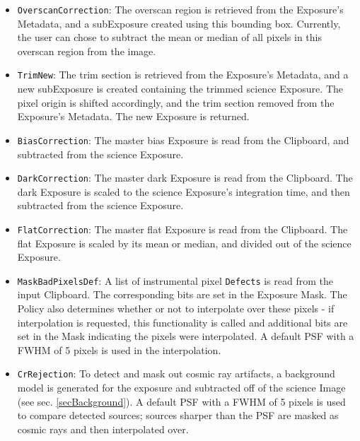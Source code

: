 \begin{itemize}
\item \texttt{OverscanCorrection}: The overscan region is retrieved from the
Exposure's Metadata, and a subExposure created using this bounding
box.  Currently, the user can chose to subtract the mean or median of
all pixels in this overscan region from the image.  

\item \texttt{TrimNew}: The trim section is retrieved from the Exposure's
Metadata, and a new subExposure is created containing the trimmed
science Exposure.  The pixel origin is shifted accordingly, and the
trim section removed from the Exposure's Metadata.  The new Exposure
is returned.

\item \texttt{BiasCorrection}: The master bias Exposure is read from the
Clipboard, and subtracted from the science Exposure.

\item \texttt{DarkCorrection}: The master dark Exposure is read from the
Clipboard.  The dark Exposure is scaled to the science Exposure's
integration time, and then subtracted from the science Exposure.

\item \texttt{FlatCorrection}: The master flat Exposure is read from the
Clipboard.  The flat Exposure is scaled by its mean or median, and
divided out of the science Exposure.

\iffalse
\item IlluminationCorrection : This is the same functionality as {\tt
FlatCorrection}.   \RHL{...but may need a different flat, depending on
how we handle the photometric v. cosmetic flats.}
\fi

\item \texttt{MaskBadPixelsDef}: A list of instrumental pixel \texttt{Defects} is read 
from the input Clipboard.  The corresponding bits are set in the
Exposure Mask.  The Policy also determines whether or not to
interpolate over these pixels - if interpolation is requested, this
functionality is called and additional bits are set in the Mask
indicating the pixels were interpolated.  A default PSF with a FWHM of
5 pixels is used in the interpolation.

\item \texttt{CrRejection}: To detect and mask out cosmic ray artifacts, a
background model is generated for the exposure and subtracted off of
the science Image (see sec. \ref{secBackground}).  A default PSF with
a FWHM of 5 pixels is used to compare detected sources; sources
sharper than the PSF are masked as cosmic rays and then interpolated
over. 


\end{itemize}
